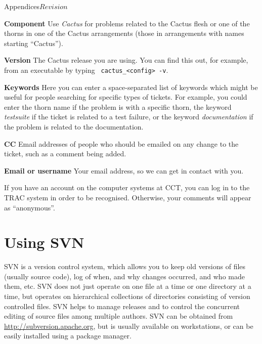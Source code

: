 \begin{cactuspart}{Appendices}{}{$Revision$}
\begin{Lentry}
\item[{\bf Component}] Use {\em Cactus} for problems related to the
  Cactus flesh or one of the thorns in one of the Cactus arrangements
  (those in arrangements with names starting ``Cactus'').

\item[{\bf Version}] The Cactus release you are using. You can find
  this out, for example, from an executable by typing {\tt
    cactus\_<config> -v}. %

\item[{\bf Keywords}] Here you can enter a space-separated list of
  keywords which might be useful for people searching for specific
  types of tickets.  For example, you could enter the thorn name if
  the problem is with a specific thorn, the keyword {\em testsuite} if
  the ticket is related to a test failure, or the keyword {\em
    documentation} if the problem is related to the documentation.

\item[{\bf CC}] Email addresses of people who should be emailed on any
  change to the ticket, such as a comment being added.

\item[{\bf Email or username}] Your email address, so we can get in
  contact with you.
\end{Lentry}

If you have an account on the computer systems at CCT, you can log in
to the TRAC system in order to be recognised.  Otherwise, your
comments will appear as ``anonymous''.


\chapter{Using SVN}
\label{sec:Appendix.svn}
SVN is a version control system, which allows you to  keep
old versions of files (usually source code), log of
when, and why changes occurred, and who made them,  etc.
SVN does not just operate on one file at a
time or one directory at a time,  but
operates  on  hierarchical collections of directories consisting of
version controlled files.  SVN helps to  manage
releases  and  to control the concurrent editing of source
files among multiple  authors. SVN can be obtained from
\url{http://subversion.apache.org}, but is usually available on workstations, or
can be easily installed using a package manager.


\end{cactuspart}
